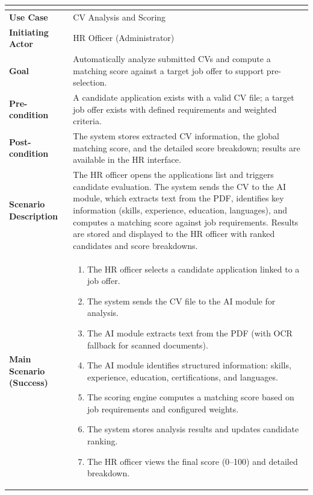 \setlength{\tabcolsep}{4pt}
\renewcommand{\arraystretch}{1.35}
\begin{table}[H]
\centering
\small
\begin{tabularx}{\textwidth}{|>{\bfseries\arraybackslash}p{4cm}|X|}
\hline
\rowcolor{headerblue}
\multicolumn{2}{|c|}{\textbf{Use Case: CV Analysis and Scoring}} \\
\hline
Use Case & CV Analysis and Scoring \\
\hline
Initiating Actor & HR Officer (Administrator) \\
\hline
Goal & Automatically analyze submitted CVs and compute a matching score against a target job offer to support pre-selection. \\
\hline
Pre-condition & A candidate application exists with a valid CV file; a target job offer exists with defined requirements and weighted criteria. \\
\hline
Post-condition & The system stores extracted CV information, the global matching score, and the detailed score breakdown; results are available in the HR interface. \\
\hline
Scenario Description &
The HR officer opens the applications list and triggers candidate evaluation. The system sends the CV to the AI module, which extracts text from the PDF, identifies key information (skills, experience, education, languages), and computes a matching score against job requirements. Results are stored and displayed to the HR officer with ranked candidates and score breakdowns. \\
\hline
Main Scenario (Success) &
\begin{enumerate}[leftmargin=*, label=\arabic*., topsep=0pt, itemsep=0pt]
	\item The HR officer selects a candidate application linked to a job offer.
	\item The system sends the CV file to the AI module for analysis.
	\item The AI module extracts text from the PDF (with OCR fallback for scanned documents).
	\item The AI module identifies structured information: skills, experience, education, certifications, and languages.
	\item The scoring engine computes a matching score based on job requirements and configured weights.
	\item The system stores analysis results and updates candidate ranking.
	\item The HR officer views the final score (0--100) and detailed breakdown.

\end{enumerate}
\end{tabularx}
\end{table}
